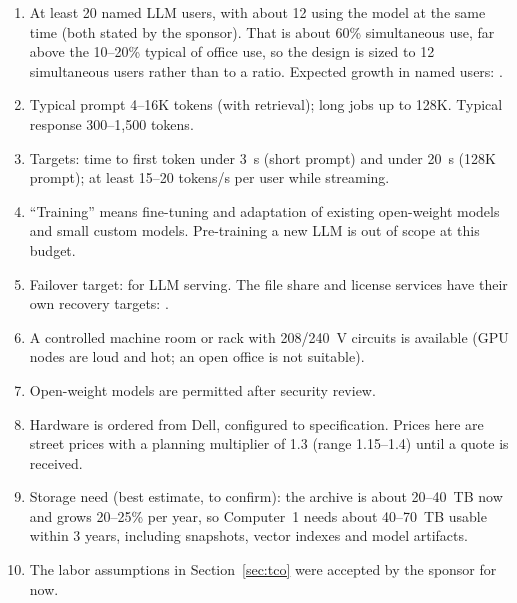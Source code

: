 \begin{enumerate}
  \item At least 20 named LLM users, with about 12 using the model at the same time
    (both stated by the sponsor). That is about 60\% simultaneous use, far above the
    10--20\% typical of office use, so the design is sized to 12 simultaneous users
    rather than to a ratio. Expected growth in named users: .
  \item Typical prompt 4--16K tokens (with retrieval); long jobs up to 128K.
    Typical response 300--1,500 tokens.
  \item Targets: time to first token under 3~s (short prompt) and under 20~s
    (128K prompt); at least 15--20 tokens/s per user while streaming.
  \item ``Training'' means fine-tuning and adaptation of existing open-weight
    models and small custom models. Pre-training a new LLM is out of scope at
    this budget.
  \item Failover target:  for
    LLM serving. The file share and license services have their own recovery
    targets: .
  \item A controlled machine room or rack with 208/240~V circuits is available
    (GPU nodes are loud and hot; an open office is not suitable).
  \item Open-weight models are permitted after security review.
  \item Hardware is ordered from Dell, configured to specification. Prices here are street
    prices with a planning multiplier of 1.3 (range 1.15--1.4) until a quote is received.
  \item Storage need (best estimate, to confirm): the archive is about 20--40~TB now and
    grows 20--25\% per year, so Computer~1 needs about 40--70~TB usable within 3 years,
    including snapshots, vector indexes and model artifacts.
  \item The labor assumptions in Section~\ref{sec:tco} were accepted by the sponsor for now.
\end{enumerate}
